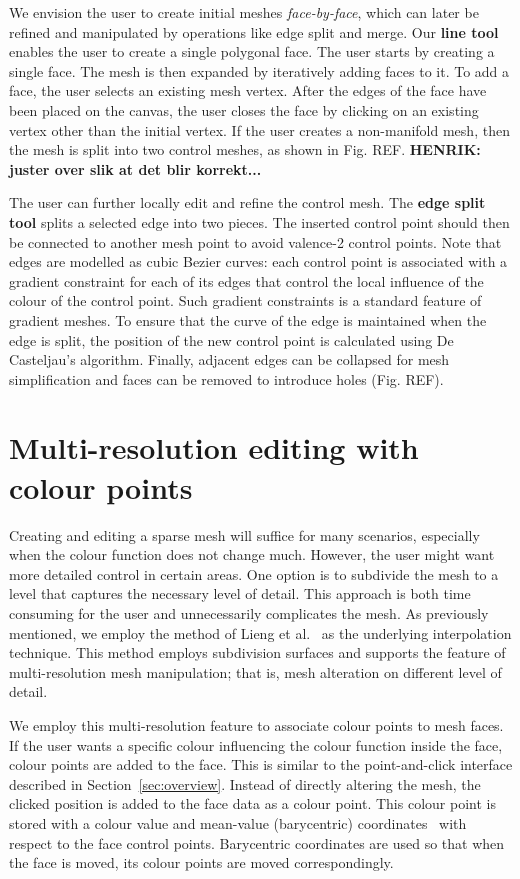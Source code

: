 \documentclass{egpubl}
\newcommand{\note}[3]{{\color{#2}\textbf{#1: #3}}}
\newcommand{\henrik}[1]{\note{HENRIK}{WildStrawberry}{#1}}
\begin{document}
We envision the user to create initial meshes \textit{face-by-face}, which can later be refined and manipulated by operations like edge split and merge. Our \textbf{line tool} enables the user to create a single polygonal face. The user starts by creating a single face. The mesh is then expanded by iteratively adding faces to it. To add a face, the user selects an existing mesh vertex. After the edges of the face have been placed on the canvas, the user closes the face by clicking on an existing vertex other than the initial vertex. If the user creates a non-manifold mesh, then the mesh is split into two control meshes, as shown in Fig. REF. \henrik{juster over slik at det blir korrekt...}

The user can further locally edit and refine the control mesh. The \textbf{edge split tool} splits a selected edge into two pieces. The inserted control point should then be connected to another mesh point to avoid valence-2 control points. Note that edges are modelled as cubic Bezier curves: each control point is associated with a gradient constraint for each of its edges that control the local influence of the colour of the control point. Such gradient constraints is a standard feature of gradient meshes. To ensure that the curve of the edge is maintained when the edge is split, the position of the new control point is calculated using De Casteljau's algorithm. Finally, adjacent edges can be collapsed for mesh simplification and faces can be removed to introduce holes (Fig. REF).

\section{Multi-resolution editing with colour points}
\label{sec:DP}

Creating and editing a sparse mesh will suffice for many scenarios, especially when the colour function does not change much. However, the user might want more detailed control in certain areas. One option is to subdivide the mesh to a level that captures the necessary level of detail. This approach is both time consuming for the user and unnecessarily complicates the mesh. As previously mentioned, we employ the method of Lieng et al.~\cite{Lieng:2016} as the underlying interpolation technique. This method employs subdivision surfaces and supports the feature of multi-resolution mesh manipulation; that is, mesh alteration on different level of detail. 

We employ this multi-resolution feature to associate colour points to mesh faces. If the user wants a specific colour influencing the colour function inside the face, colour points are added to the face. This is similar to the point-and-click interface described in Section~\ref{sec:overview}. Instead of directly altering the mesh, the clicked position is added to the face data as a colour point. This colour point is stored with a colour value and mean-value (barycentric) coordinates~\cite{Floater:2003} with respect to the face control points. Barycentric coordinates are used so that when the face is moved, its colour points are moved correspondingly.
\end{document}
